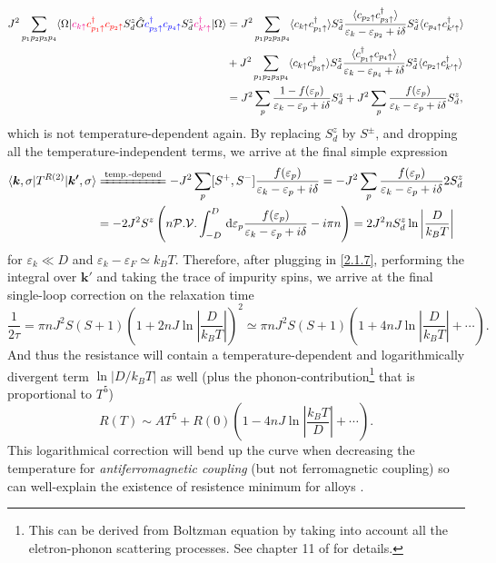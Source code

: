 \documentclass[aps,prx,superscriptaddress,onecolumn,preprintnumbers,nofootinbib,longbibliography]{revtex4-1}
\newcommand*\dd{\mathop{}\!\mathrm{d}}
\begin{document}
		\begin{align}
			J^2\sum_{p_1p_2p_3p_4}\langle\Omega|{\color{magenta}c_{k\uparrow}}{\color{red}c_{p_1\uparrow}^\dagger c_{p_2\uparrow}}S_d^z \hat{G}{\color{blue}c_{p_3\uparrow}^\dagger c_{p_4\uparrow}}S_d^z{\color{magenta}c_{k'\uparrow}^\dagger}|\Omega\rangle&=J^2\sum_{p_1p_2p_3p_4}\langle c_{k\uparrow} c_{p_1\uparrow}^\dagger\rangle S_d^z\dfrac{\langle c_{p_2\uparrow} c_{p_3\uparrow}^\dagger\rangle}{\varepsilon_k- \varepsilon_{p_2}+i\delta}S_d^z\langle c_{p_4\uparrow} c_{k'\uparrow}^\dagger\rangle\nonumber\\
			&+J^2\sum_{p_1p_2p_3p_4}\langle c_{k\uparrow} c_{p_3\uparrow}^\dagger\rangle S_d^z\dfrac{\langle c_{p_1\uparrow}^\dagger c_{p_4\uparrow}\rangle}{\varepsilon_k-\varepsilon_{p_4}+i\delta}S_d^z\langle c_{p_2\uparrow} c_{k'\uparrow}^\dagger\rangle\nonumber\\
			&=J^2\sum_p\dfrac{1-f(\varepsilon_p)}{\varepsilon_k- \varepsilon_p+i\delta}S_d^z+J^2\sum_p\dfrac{f(\varepsilon_p)}{\varepsilon_k- \varepsilon_p+i\delta}S_d^z,\label{2.2.6}
		\end{align}
		which is not temperature-dependent again. By replacing $S_d^z$ by $S^\pm$, and dropping all the temperature-independent terms, we arrive at the final simple expression
		\begin{align}
			\langle\bm{k},\sigma|T^{R(2)}|\bm{k'},\sigma\rangle&\xlongequal{\text{temp.-depend}}-J^2\sum_p[S^+,S^-]\dfrac{f(\varepsilon_p)}{\varepsilon_k- \varepsilon_p+i\delta}=-J^2\sum_p\dfrac{f(\varepsilon_p)}{\varepsilon_k- \varepsilon_p+i\delta}2S_d^z\nonumber\\
			&=-2J^2S^z\left(n\mathcal{P.V.}\int_{-D}^D\,\dd \varepsilon_p\dfrac{f(\varepsilon_p)}{\varepsilon_k- \varepsilon_p+i\delta}-i\pi n\right)=2J^2nS_d^z\ln\left|\dfrac{D}{k_BT}\right|\label{2.2.7}
		\end{align}
		for $\varepsilon_k\ll D$ and $\varepsilon_k- \varepsilon_F\simeq k_BT$. Therefore, after plugging in \eqref{2.1.7}, performing the integral over $\bm{k'}$ and taking the trace of impurity spins, we arrive at the final single-loop correction on the relaxation time
		\begin{equation}\label{2.2.8}
			\dfrac{1}{2\tau}=\pi n J^2S(S+1)\left(1+2nJ\ln\left|\dfrac{D}{k_BT}\right|\right)^2\simeq\pi n J^2S(S+1)\left(1+4nJ\ln\left|\dfrac{D}{k_BT}\right|+\cdots\right).
		\end{equation}
		And thus the resistance will contain a temperature-dependent and logarithmically divergent term $\ln|D/k_BT|$ as well (plus the phonon-contribution\footnote{This can be derived from Boltzman equation by taking into account all the eletron-phonon scattering processes. See chapter 11 of \cite{phillips2012advanced} for details.} that is proportional to $T^5$)
		\begin{equation}\label{2.2.9}
			R(T)\sim AT^5+R(0)\left(1-4n J\ln\left|\dfrac{k_BT}{D}\right|+\cdots\right).
		\end{equation}
		This logarithmical correction will bend up the curve when decreasing the temperature for \emph{antiferromagnetic coupling} (but not ferromagnetic coupling) so can well-explain the existence of resistence minimum for alloys \cite{kondo1964resistance}.
\end{document}
